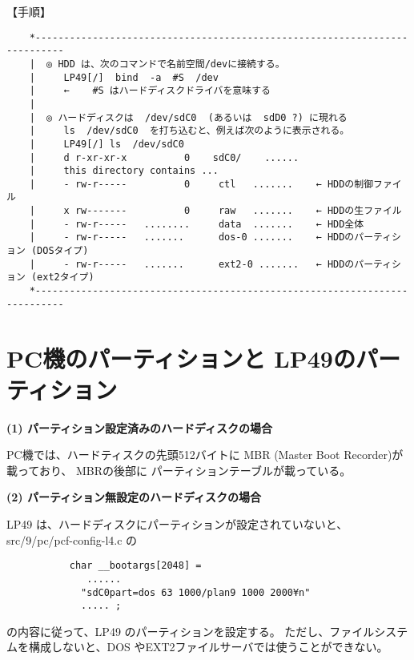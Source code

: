  【手順】\\
\begin{verbatim}
    *---------------------------------------------------------------------------
    |  ◎ HDD は、次のコマンドで名前空間/devに接続する。                 
    |     LP49[/]  bind  -a  #S  /dev                                   
    |     ←    #S はハードディスクドライバを意味する                    
    |                                                                   
    |  ◎ ハードディスクは  /dev/sdC0  (あるいは  sdD0 ?) に現れる       
    |     ls  /dev/sdC0  を打ち込むと、例えば次のように表示される。     
    |     LP49[/] ls  /dev/sdC0                                         
    |     d r-xr-xr-x          0    sdC0/    ......                     
    |     this directory contains ...                                   
    |     - rw-r-----          0     ctl   .......    ← HDDの制御ファイル 
    |     x rw-------          0     raw   .......    ← HDDの生ファイル   
    |     - rw-r-----   ........     data  .......    ← HDD全体           
    |     - rw-r-----   .......      dos-0 .......    ← HDDのパーティション (DOSタイプ) 
    |     - rw-r-----   .......      ext2-0 .......   ← HDDのパーティション (ext2タイプ)
    *---------------------------------------------------------------------------
\end{verbatim}

\section{PC機のパーティションと LP49のパーティション}

{\bf (1) パーティション設定済みのハードディスクの場合}

       PC機では、ハードティスクの先頭512バイトに MBR (Master Boot Recorder)が載っており、
    MBRの後部に パーティションテーブルが載っている。



{\bf  (2) パーティション無設定のハードディスクの場合} 

       LP49 は、ハードディスクにパーティションが設定されていないと、src/9/pc/pcf-config-l4.c の  
\begin{verbatim}
           char __bootargs[2048] = 
              ......
             "sdC0part=dos 63 1000/plan9 1000 2000¥n"
             ..... ;
\end{verbatim}
       の内容に従って、LP49 のパーティションを設定する。
       ただし、ファイルシステムを構成しないと、DOS やEXT2ファイルサーバでは使うことができない。


